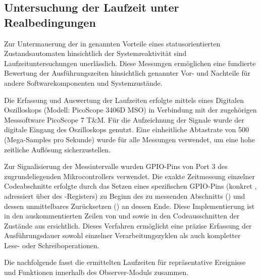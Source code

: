 
\newpage
\subsection{Untersuchung der Laufzeit unter Realbedingungen}
\label{sec:laufzeit}

Zur Untermauerung der in  genannten Vorteile eines statusorientierten Zustandsautomaten hinsichtlich der Systemreaktivit\"at sind Laufzeituntersuchungen unerl\"asslich. Diese Messungen erm\"oglichen eine fundierte Bewertung der Ausf\"uhrungszeiten hinsichtlich genannter Vor- und Nachteile f\"ur andere Softwarekomponenten und Systemzust\"ande.

Die Erfassung und Auswertung der Laufzeiten erfolgte mittels eines Digitalen Oszilloskops (Modell: PicoScope 3406D MSO) in Verbindung mit der zugeh\"origen Messsoftware PicoScope 7 T\&M. F\"ur die Aufzeichnung der Signale wurde der digitale Eingang  des Oszilloskops genutzt. Eine einheitliche Abtastrate von 500  (Mega-Samples pro Sekunde) wurde f\"ur alle Messungen verwendet, um eine hohe zeitliche Aufl\"osung sicherzustellen.

Zur Signalisierung der Messintervalle wurden GPIO-Pins von Port 3 des zugrundeliegenden Mikrocontrollers verwendet. Die exakte Zeitmessung einzelner Codeabschnitte erfolgte durch das Setzen eines spezifischen GPIO-Pins (konkret , adressiert \"uber  des -Registers) zu Beginn des zu messenden Abschnitts () und dessen unmittelbares Zur\"ucksetzen () an dessen Ende. Diese Implementierung ist in den auskommentierten Zeilen von  und  sowie in den Codeausschnitten der Zust\"ande aus  ersichtlich. Dieses Verfahren erm\"oglicht eine pr\"azise Erfassung der Ausf\"uhrungsdauer sowohl einzelner Verarbeitungszyklen als auch kompletter Lese- oder Schreiboperationen.

\newpage
Die nachfolgende  fasst die ermittelten Laufzeiten f\"ur repr\"asentative Ereignisse und Funktionen innerhalb des Observer-Moduls zusammen.

